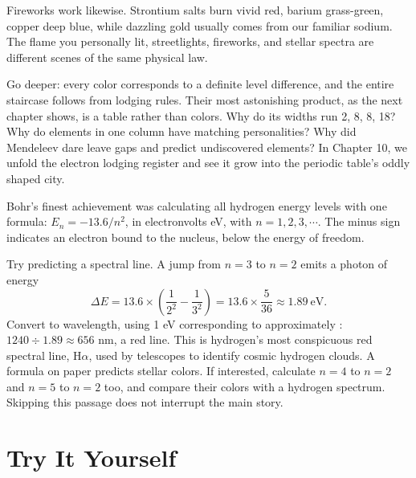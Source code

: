 Fireworks work likewise. Strontium salts burn vivid red, barium grass-green, copper deep blue, while dazzling gold usually comes from our familiar sodium. The flame you personally lit, streetlights, fireworks, and stellar spectra are different scenes of the same physical law.

Go deeper: every color corresponds to a definite level difference, and the entire staircase follows from lodging rules. Their most astonishing product, as the next chapter shows, is a table rather than colors. Why do its widths run 2, 8, 8, 18? Why do elements in one column have matching personalities? Why did Mendeleev dare leave gaps and predict undiscovered elements? In Chapter 10, we unfold the electron lodging register and see it grow into the periodic table's oddly shaped city.

\begin{tiaozhan}
Bohr's finest achievement was calculating all hydrogen energy levels with one formula: $E_n = -13.6/n^2$, in electronvolts eV, with $n=1,2,3,\cdots$. The minus sign indicates an electron bound to the nucleus, below the energy of freedom.

Try predicting a spectral line. A jump from $n=3$ to $n=2$ emits a photon of energy
\[\Delta E = 13.6\times\left(\frac{1}{2^2}-\frac{1}{3^2}\right) = 13.6\times\frac{5}{36} \approx 1.89\ \text{eV}.\]
Convert to wavelength, using 1 eV corresponding to approximately : $1240 \div 1.89 \approx 656$ nm, a red line. This is hydrogen's most conspicuous red spectral line, H$\alpha$, used by telescopes to identify cosmic hydrogen clouds. A formula on paper predicts stellar colors. If interested, calculate $n=4$ to $n=2$ and $n=5$ to $n=2$ too, and compare their colors with a hydrogen spectrum. Skipping this passage does not interrupt the main story.
\end{tiaozhan}

\section*{Try It Yourself}

